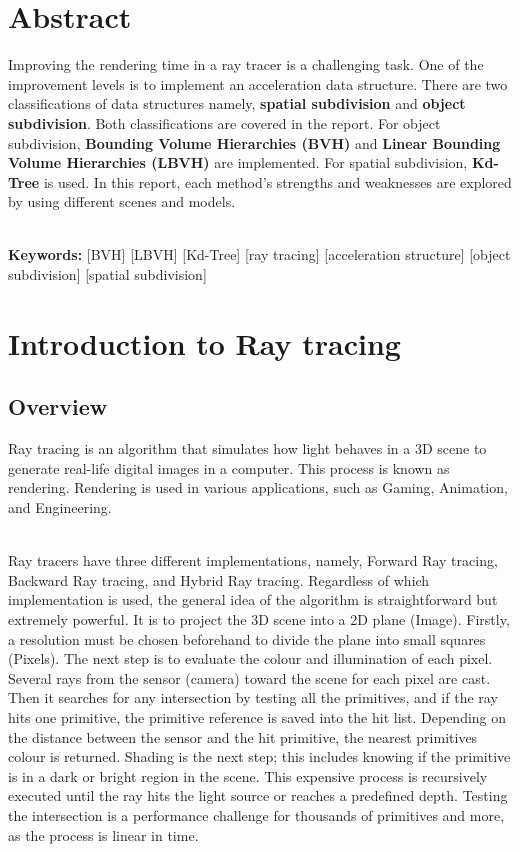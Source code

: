 \documentclass[11pt,a4paper]{article}
\begin{document}
\section*{Abstract}
Improving the rendering time in a ray tracer is a challenging task. One of the improvement levels is to implement an acceleration data structure. There are two classifications of data structures namely, \textbf{spatial subdivision} and \textbf{object subdivision}. Both classifications are covered in the report. For object subdivision, \textbf{Bounding Volume Hierarchies (BVH)} and \textbf{Linear Bounding Volume Hierarchies (LBVH)} are implemented. For spatial subdivision, \textbf{Kd-Tree} is used. In this report, each method's strengths and weaknesses are explored by using different scenes and models.

\noindent
\\
\textbf{Keywords:} [BVH] [LBVH] [Kd-Tree] [ray tracing] [acceleration structure]  [object subdivision] [spatial
subdivision] 
\clearpage
\tableofcontents
\clearpage



\section{Introduction to Ray tracing}
\subsection{Overview}
Ray tracing is an algorithm that simulates how light behaves in a 3D scene to generate real-life digital images in a computer. This process is known as rendering. Rendering is used in various applications, such as Gaming, Animation, and Engineering.

\noindent
\\
Ray tracers have three different implementations, namely, Forward Ray tracing, Backward Ray tracing, and Hybrid Ray tracing. Regardless of which implementation is used, the general idea of the algorithm is straightforward but extremely powerful. It is to project the 3D scene into a 2D plane (Image). Firstly, a resolution must be chosen beforehand to divide the plane into small squares (Pixels). The next step is to evaluate the colour and illumination of each pixel. Several rays from the sensor (camera) toward the scene for each pixel are cast. Then it searches for any intersection by testing all the primitives, and if the ray hits one primitive, the primitive reference is saved into the hit list. Depending on the distance between the sensor and the hit primitive, the nearest primitives colour is returned. Shading is the next step; this includes knowing if the primitive is in a dark or bright region in the scene. This expensive process is recursively executed until the ray hits the light source or reaches a predefined depth. Testing the intersection is a performance challenge for thousands of primitives and more, as the process is linear in time.
\end{document}
